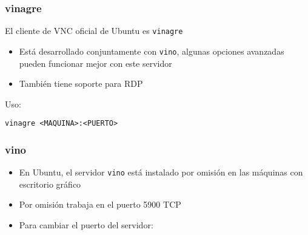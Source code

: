 \documentclass[ucs]{beamer}
\begin{document}
\begin{frame}[fragile]
\frametitle{vinagre}
El cliente de VNC oficial de Ubuntu es
\verb|vinagre| 
\begin{itemize}
\item
Está desarrollado conjuntamente con
\verb|vino|, algunas opciones avanzadas pueden funcionar mejor con este servidor

\item
También tiene soporte para RDP 
\end{itemize}

Uso:

\verb|vinagre <MAQUINA>:<PUERTO>| 
\end{frame}





\begin{frame}[fragile]
\frametitle{vino}
\begin{itemize}
\item
En Ubuntu, 
el servidor
\verb|vino| 
está instalado por omisión en las máquinas con escritorio 
gráfico
\item
Por omisión
trabaja en el puerto 5900 TCP

\item

Para cambiar el puerto del servidor:

\end{itemize}

\end{frame}
\end{document}
